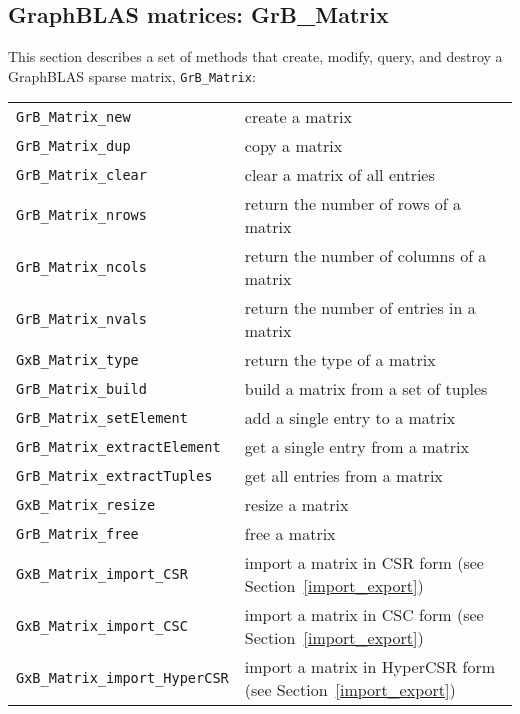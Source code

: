 \documentclass[12pt]{article}
\begin{document}
\subsection{GraphBLAS matrices: {\sf GrB\_Matrix}} %
\label{matrix}

This section describes a set of methods that create, modify, query,
and destroy a GraphBLAS sparse matrix, \verb'GrB_Matrix':

\vspace{0.2in}
{\footnotesize
\begin{tabular}{ll}
\hline
\verb'GrB_Matrix_new'           & create a matrix \\
\verb'GrB_Matrix_dup'           & copy a matrix \\
\verb'GrB_Matrix_clear'         & clear a matrix of all entries \\
\verb'GrB_Matrix_nrows'         & return the number of rows of a matrix \\
\verb'GrB_Matrix_ncols'         & return the number of columns of a matrix \\
\verb'GrB_Matrix_nvals'         & return the number of entries in a matrix \\
\verb'GxB_Matrix_type'          & return the type of a matrix \\
\verb'GrB_Matrix_build'         & build a matrix from a set of tuples \\
\verb'GrB_Matrix_setElement'    & add a single entry to a matrix \\
\verb'GrB_Matrix_extractElement'& get a single entry from a matrix \\
\verb'GrB_Matrix_extractTuples' & get all entries from a matrix \\
\verb'GxB_Matrix_resize'        & resize a matrix \\
\verb'GrB_Matrix_free'          & free a matrix \\
\hline
\verb'GxB_Matrix_import_CSR'            & import a matrix in CSR form
                                          (see Section~\ref{import_export})\\
\verb'GxB_Matrix_import_CSC'            & import a matrix in CSC form
                                          (see Section~\ref{import_export})\\
\verb'GxB_Matrix_import_HyperCSR'       & import a matrix in HyperCSR form
                                          (see Section~\ref{import_export})\\

\end{tabular}}
\end{document}
